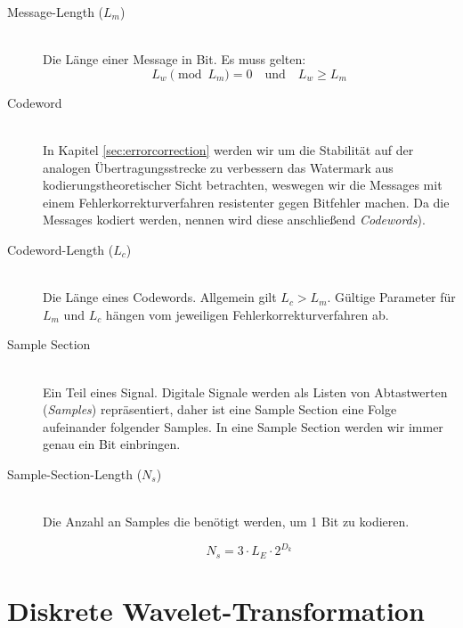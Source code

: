 \begin{description}
\item[Message-Length (${L}_{m}$)] \hfill \\ 
Die L\"ange einer Message in Bit. Es muss gelten: 
	 \begin{equation}
		 {L}_{w} \pmod{{L}_{m}} = 0 \quad\mbox{und}\quad {L}_{w}\geq{L}_{m} \label{equ:wmkseqlength}
	 \end{equation}
	 
\item[Codeword] \hfill \\ 
In Kapitel \ref{sec:errorcorrection} werden wir um die Stabilit\"at auf der analogen Übertragungsstrecke zu verbessern das Watermark aus kodierungstheoretischer Sicht betrachten, weswegen wir die Messages mit einem Fehlerkorrekturverfahren resistenter gegen Bitfehler machen. Da die Messages kodiert werden, nennen wird diese anschließend \textit{Codewords}).

\item[Codeword-Length (${L}_{c}$)] \hfill \\ 
Die Länge eines Codewords. Allgemein gilt ${L}_{c} > {L}_{m}$. Gültige Parameter für ${L}_{m}$ und ${L}_{c}$ hängen vom jeweiligen Fehlerkorrekturverfahren ab.
	 
\item[Sample Section] \hfill \\ 
Ein Teil eines Signal. Digitale Signale werden als Listen von Abtastwerten (\textit{Samples}) repräsentiert, daher ist eine Sample Section eine Folge aufeinander folgender Samples. In eine Sample Section werden wir immer genau ein Bit einbringen.
	 
\item[Sample-Section-Length (${N}_{s}$)] \hfill \\ 
Die Anzahl an Samples die ben\"otigt werden, um 1 Bit zu kodieren. 

	 \begin{equation}
		 {N}_{s} = 3 \cdot {L}_{E} \cdot 2 ^ {{D}_{k}} \label{equ:samplseclength}
	 \end{equation}
	
\end{description}

\section{Diskrete Wavelet-Transformation}  
	
